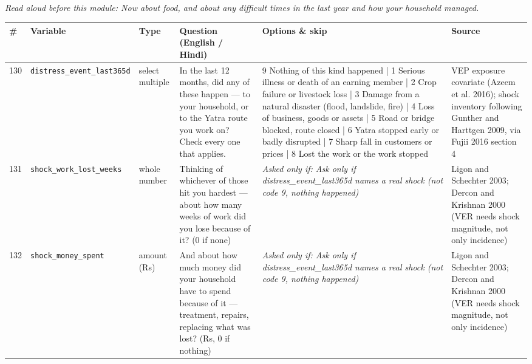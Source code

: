 \documentclass[9pt,a4paper,landscape]{article}
\begin{document}
\\[3pt]
{\small\itshape Read aloud before this module: Now about food, and about any difficult times in the last year and how your household managed.}\\[5pt]
\begin{longtable}{@{}p{0.5cm}p{3.3cm}p{1.7cm}p{7.3cm}p{5.6cm}p{5.4cm}@{}}
\toprule \footnotesize\textbf{\#} & \footnotesize\textbf{Variable} & \footnotesize\textbf{Type} & \footnotesize\textbf{Question (English / Hindi)} & \footnotesize\textbf{Options {\&} skip} & \footnotesize\textbf{Source}\\ \midrule
\endhead
\footnotesize 130 & \footnotesize\texttt{distress\_event\_last365d} & \scriptsize select multiple & \footnotesize In the last 12 months, did any of these happen — to your household, or to the Yatra route you work on? Check every one that applies.\par\vspace{1pt}{\footnotesize\color{hdr}{\hifont पिछले 12 महीनों में इनमें से क्या-क्या हुआ — आपके घर के साथ, या जिस यात्रा मार्ग पर आप काम करते हैं उस पर? जो-जो हुआ, सब चुनिए।}} & \scriptsize 9 Nothing of this kind happened | 1 Serious illness or death of an earning member | 2 Crop failure or livestock loss | 3 Damage from a natural disaster (flood, landslide, fire) | 4 Loss of business, goods or assets | 5 Road or bridge blocked, route closed | 6 Yatra stopped early or badly disrupted | 7 Sharp fall in customers or prices | 8 Lost the work or the work stopped & \scriptsize VEP exposure covariate (Azeem et al. 2016); shock inventory following Gunther and Harttgen 2009, via Fujii 2016 section 4\\
\footnotesize 131 & \footnotesize\texttt{shock\_work\_lost\_weeks} & \scriptsize whole number & \footnotesize Thinking of whichever of those hit you hardest — about how many weeks of work did you lose because of it? (0 if none)\par\vspace{1pt}{\footnotesize\color{hdr}{\hifont इनमें से जो सबसे भारी पड़ा — उसके कारण लगभग कितने हफ़्ते का काम छूटा? (कुछ न छूटा हो तो 0)}} & \scriptsize \textit{Asked only if: Ask only if distress\_event\_last365d names a real shock (not code 9, nothing happened)} & \scriptsize Ligon and Schechter 2003; Dercon and Krishnan 2000 (VER needs shock magnitude, not only incidence)\\
\footnotesize 132 & \footnotesize\texttt{shock\_money\_spent} & \scriptsize amount (Rs) & \footnotesize And about how much money did your household have to spend because of it — treatment, repairs, replacing what was lost? (Rs, 0 if nothing)\par\vspace{1pt}{\footnotesize\color{hdr}{\hifont और उसके कारण आपके घर को लगभग कितना पैसा ख़र्च करना पड़ा — इलाज, मरम्मत, जो नुक़सान हुआ उसे पूरा करना? (रुपये, कुछ नहीं तो 0)}} & \scriptsize \textit{Asked only if: Ask only if distress\_event\_last365d names a real shock (not code 9, nothing happened)} & \scriptsize Ligon and Schechter 2003; Dercon and Krishnan 2000 (VER needs shock magnitude, not only incidence)\\

\end{longtable}
\end{document}

